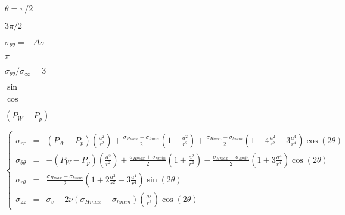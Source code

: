 \documentclass[onecolumn,11pt]{report}
\def\lthtmlcheckvsize{\ifdim\ht\sizebox<\vsize 
  \ifdim\wd\sizebox<\hsize\expandafter\hfill\fi \expandafter\vfill
  \else\expandafter\vss\fi}%
\begin{document}
{\newpage\clearpage
{}%
$ \theta = \pi/2$%
\lthtmlindisplaymathZ
\lthtmlcheckvsize\clearpage}

{\newpage\clearpage
{}%
$ 3\pi/2$%
\lthtmlindisplaymathZ
\lthtmlcheckvsize\clearpage}

{\newpage\clearpage
{}%
$ \sigma_{\theta \theta} = - \Delta \sigma$%
\lthtmlindisplaymathZ
\lthtmlcheckvsize\clearpage}

{\newpage\clearpage
{}%
$ \pi$%
\lthtmlindisplaymathZ
\lthtmlcheckvsize\clearpage}

{\newpage\clearpage
{}%
$ \sigma_{\theta \theta}/\sigma_{\infty}=3$%
\lthtmlindisplaymathZ
\lthtmlcheckvsize\clearpage}

{\newpage\clearpage
{}%
$ \sin$%
\lthtmlindisplaymathZ
\lthtmlcheckvsize\clearpage}

{\newpage\clearpage
{}%
$ \cos$%
\lthtmlindisplaymathZ
\lthtmlcheckvsize\clearpage}

{\newpage\clearpage
{}%
$ (P_W - P_p)$%
\lthtmlindisplaymathZ
\lthtmlcheckvsize\clearpage}

{\newpage\clearpage
{}%
\begin{displaymath}\left\lbrace
\begin{array}{rcl}
\sigma_{rr} & = &
(P_W - P_p) \left( \frac{a^2}{r^2} \right) +
\frac{\sigma_{Hmax}+\sigma_{hmin}}{2} \left( 1 -\frac{a^2}{r^2} \right) +
\frac{\sigma_{Hmax}-\sigma_{hmin}}{2} \left( 1 -4 \frac{a^2}{r^2} +3 \frac{a^4}{r^4} \right) \cos (2\theta) \\
\sigma_{\theta \theta} & = &
-(P_W - P_p) \left( \frac{a^2}{r^2} \right)
+\frac{\sigma_{Hmax}+\sigma_{hmin}}{2} \left( 1 +\frac{a^2}{r^2} \right) -
\frac{\sigma_{Hmax}-\sigma_{hmin}}{2} \left( 1 +3 \frac{a^4}{r^4} \right) \cos (2\theta) \\
\sigma_{r \theta} & = &
\frac{\sigma_{Hmax}-\sigma_{hmin}}{2} \left( 1 +2 \frac{a^2}{r^2} -3 \frac{a^4}{r^4} \right) \sin (2\theta) \\
\sigma_{zz} & = & \sigma_v - 2 \nu \left( \sigma_{Hmax}-\sigma_{hmin} \right) \left( \frac{a^2}{r^2} \right) \cos (2\theta)
\end{array}
\right.\end{displaymath}%
\lthtmldisplayZ
\lthtmlcheckvsize\clearpage}
\end{document}
